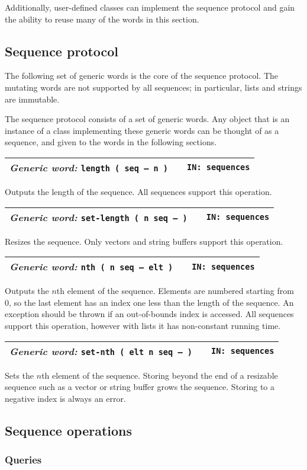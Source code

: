 \documentclass{report}
\newcommand{\genericword}[3]{\index{#1}
\emph{Generic word:} \texttt{#2} &&\texttt{IN: #3}}
\newcommand{\wordtable}[1]{

\begin{tabularx}{12cm}[t]{lXr}
\hline
#1\\
\hline
\end{tabularx}

}
\begin{document}
Additionally, user-defined classes can implement the sequence protocol and gain the ability to reuse many of the words in this section.

\subsection{Sequence protocol}

The following set of generic words is the core of the sequence protocol. The mutating words are not supported by all sequences; in particular, lists and strings are immutable.

The sequence protocol consists of a set of generic words. Any object that is an instance of a class implementing these generic words can be thought of as a sequence, and given to the words in the following sections.

\wordtable{
\genericword{length}{length ( seq -- n )}{sequences}
}
Outputs the length of the sequence. All sequences support this operation.
\wordtable{
\genericword{set-length}{set-length ( n seq -- )}{sequences}
}
Resizes the sequence. Only vectors and string buffers support this operation.

\wordtable{
\genericword{nth}{nth ( n seq -- elt )}{sequences}
}
Outputs the $n$th element of the sequence. Elements are numbered starting from 0, so the last element has an index one less than the length of the sequence. An exception should be thrown if an out-of-bounds index is accessed. All sequences support this operation, however with lists it has non-constant running time.

\wordtable{
\genericword{set-nth}{set-nth ( elt n seq -- )}{sequences}
}
Sets the $n$th element of the sequence. Storing beyond the end of a resizable sequence such as a vector or string buffer grows the sequence. Storing to a negative index is always an error.

\subsection{Sequence operations}

\subsubsection{Queries}
\end{document}
